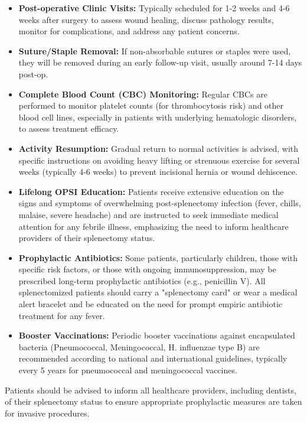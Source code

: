 \begin{itemize}
  \item \textbf{Post-operative Clinic Visits:} Typically scheduled for 1-2 weeks and 4-6 weeks after surgery to assess wound healing, discuss pathology results, monitor for complications, and address any patient concerns.
  \item \textbf{Suture/Staple Removal:} If non-absorbable sutures or staples were used, they will be removed during an early follow-up visit, usually around 7-14 days post-op.
  \item \textbf{Complete Blood Count (CBC) Monitoring:} Regular CBCs are performed to monitor platelet counts (for thrombocytosis risk) and other blood cell lines, especially in patients with underlying hematologic disorders, to assess treatment efficacy.
  \item \textbf{Activity Resumption:} Gradual return to normal activities is advised, with specific instructions on avoiding heavy lifting or strenuous exercise for several weeks (typically 4-6 weeks) to prevent incisional hernia or wound dehiscence.
  \item \textbf{Lifelong OPSI Education:} Patients receive extensive education on the signs and symptoms of overwhelming post-splenectomy infection (fever, chills, malaise, severe headache) and are instructed to seek immediate medical attention for any febrile illness, emphasizing the need to inform healthcare providers of their splenectomy status.
  \item \textbf{Prophylactic Antibiotics:} Some patients, particularly children, those with specific risk factors, or those with ongoing immunosuppression, may be prescribed long-term prophylactic antibiotics (e.g., penicillin V). All splenectomized patients should carry a "splenectomy card" or wear a medical alert bracelet and be educated on the need for prompt empiric antibiotic treatment for any fever.
  \item \textbf{Booster Vaccinations:} Periodic booster vaccinations against encapsulated bacteria (Pneumococcal, Meningococcal, H. influenzae type B) are recommended according to national and international guidelines, typically every 5 years for pneumococcal and meningococcal vaccines.
\end{itemize}
Patients should be advised to inform all healthcare providers, including dentists, of their splenectomy status to ensure appropriate prophylactic measures are taken for invasive procedures.

